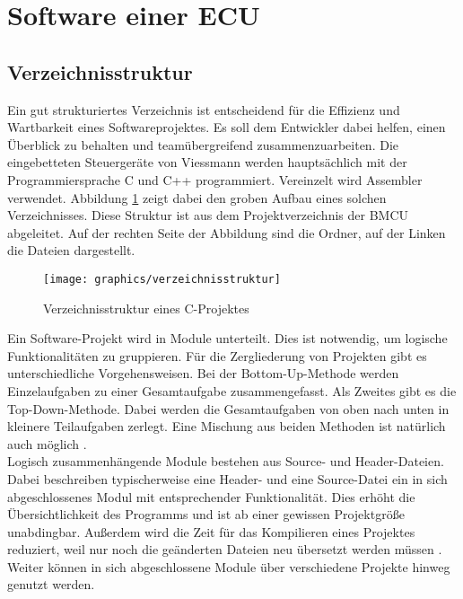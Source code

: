\section{Software einer ECU}\label{kap:projektaufbau}
\subsection{Verzeichnisstruktur}
Ein gut strukturiertes Verzeichnis ist entscheidend für die Effizienz und Wartbarkeit eines Softwareprojektes.
Es soll dem Entwickler dabei helfen, einen Überblick zu behalten und teamübergreifend zusammenzuarbeiten.
Die eingebetteten Steuergeräte von Viessmann werden hauptsächlich mit der Programmiersprache C und C++ programmiert. 
Vereinzelt wird Assembler verwendet.
Abbildung \ref{fig:verzeichnisstruktur} zeigt dabei den groben Aufbau eines solchen Verzeichnisses.
Diese Struktur ist aus dem Projektverzeichnis der \ac{BMCU} abgeleitet.
Auf der rechten Seite der Abbildung sind die Ordner, auf der Linken die Dateien dargestellt. \\

\begin{figure}[H]
	\centering
	\texttt{[image: graphics/verzeichnisstruktur]}
	\caption{Verzeichnisstruktur eines C-Projektes}
	\label{fig:verzeichnisstruktur}
\end{figure}

Ein Software-Projekt wird in Module unterteilt.
Dies ist notwendig, um logische Funktionalitäten zu gruppieren.
Für die Zergliederung von Projekten gibt es unterschiedliche Vorgehensweisen.
Bei der Bottom-Up-Methode werden Einzelaufgaben zu einer Gesamtaufgabe zusammengefasst.
Als Zweites gibt es die Top-Down-Methode.
Dabei werden die Gesamtaufgaben von oben nach unten in kleinere Teilaufgaben zerlegt.
Eine Mischung aus beiden Methoden ist natürlich auch möglich \cite{Garcia2017-op}. \\

Logisch zusammenhängende Module bestehen aus Source- und Header-Dateien.
Dabei beschreiben typischerweise eine Header- und eine Source-Datei ein in sich abgeschlossenes Modul mit entsprechender Funktionalität.
Dies erhöht die Übersichtlichkeit des Programms und ist ab einer gewissen Projektgröße unabdingbar.
Außerdem wird die Zeit für das Kompilieren eines Projektes reduziert, weil nur noch die geänderten Dateien neu übersetzt werden müssen \cite{Klima2010-br}.
Weiter können in sich abgeschlossene Module über verschiedene Projekte hinweg genutzt werden.\\

